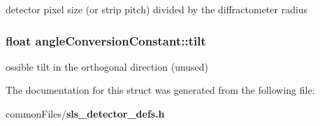 detector pixel size (or strip pitch) divided by the diffractometer radius 
\subsubsection{\setlength{\rightskip}{0pt plus 5cm}float \bf{angle\-Conversion\-Constant::tilt}}\label{structangleConversionConstant_23af3f7c89696b83abb6a713061cc4b9}


ossible tilt in the orthogonal direction (unused) 

The documentation for this struct was generated from the following file:\begin{CompactItemize}
\item 
common\-Files/\bf{sls\_\-detector\_\-defs.h}\end{CompactItemize}
